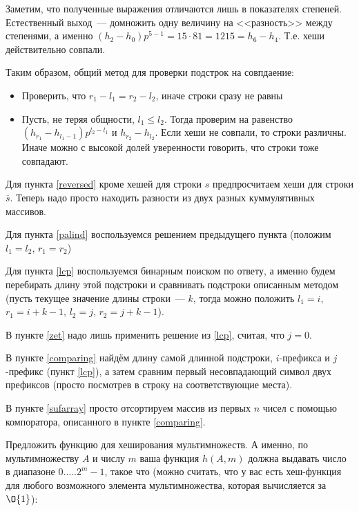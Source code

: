 \documentclass[addpoints]{exam}
\begin{document}
\begin{questions}
\begin{solution}
Заметим, что полученные выражения отличаются лишь в показателях степеней. Естественный выход~--- домножить одну величину на <<разность>> между степенями, а именно $(h_2 - h_0) p^{5-1} = 15 \cdot 81 = 1215 = h_6 - h_4$. Т.е. хеши действительно совпали.

Таким образом, общий метод для проверки подстрок на совпдаение:

\begin{itemize}
\item Проверить, что $r_1 - l_1 = r_2 - l_2$, иначе строки сразу не равны
\item Пусть, не теряя общности, $l_1 \leqslant l_2$. Тогда проверим на равенство $(h_{r_1} - h_{l_1 - 1}) p^{l_2 - l_1}$ и $h_{r_2} - h_{l_2}$. Если хеши не совпали, то строки различны. Иначе можно с высокой долей уверенности говорить, что строки тоже совпадают.
\end{itemize}

Для пункта \ref{reversed} кроме хешей для строки $s$ предпросчитаем хеши для строки $\overline{s}$. Теперь надо просто находить разности из двух разных куммулятивных массивов.

Для пункта \ref{palind} воспользуемся решением предыдущего пункта (положим $l_1 = l_2$, $r_1 = r_2$)

Для пункта \ref{lcp} воспользуемся бинарным поиском по ответу, а именно будем перебирать длину этой подстроки и сравнивать подстроки описанным методом (пусть текущее значение длины строки~--- $k$, тогда можно положить $l_1 = i$, $r_1 = i + k - 1$, $l_2 = j$, $r_2 = j + k - 1$).

В пункте \ref{zet} надо лишь применить решение из \ref{lcp}, считая, что $j=0$.

В пункте \ref{comparing} найдём длину самой длинной подстроки, $i$-префикса и $j$-префикс (пункт \ref{lcp}), а затем сравним первый несовпадающий символ двух префиксов (просто посмотрев в строку на соответствующие места).

В пункте \ref{sufarray} просто отсортируем массив из первых $n$ чисел с помощью компоратора, описанного в пункте \ref{comparing}.


\end{solution}

\question Предложить функцию для хеширования мультимножеств. А именно, по мультимножеству $A$ и числу $m$ ваша функция $h(A, m)$ должна выдавать число в диапазоне $0\ldots..2^{m}-1$, такое что (можно считать, что у вас есть хеш-функция для любого возможного элемента мультимножества, которая вычисляется за $\O{1}$):


\end{questions}
\end{document}
